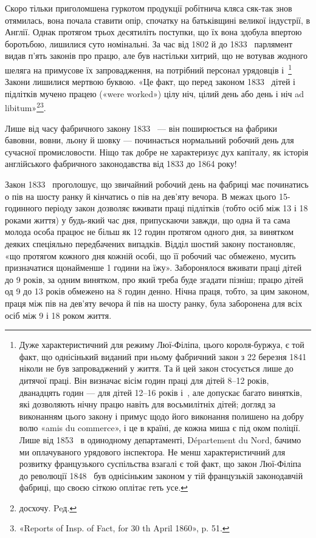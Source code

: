 Скоро тільки приголомшена гуркотом продукції робітнича
кляса сяк-так знов отямилась, вона почала ставити опір, спочатку
на батьківщині великої індустрії, в Англії. Однак протягом
трьох десятиліть поступки, що їх вона здобула впертою боротьбою,
лишилися суто номінальні. За час від 1802 й до 1833~
парлямент видав п’ять законів про працю, але був настільки
хитрий, що не вотував жодного шеляга на примусове їх запровадження,
на потрібний персонал урядовців і~\footnote{
Дуже характеристичний для режиму Люї-Філіпа, цього короля-буржуа,
є той факт, що однісінький виданий при ньому фабричний
закон з 22 березня 1841~ ніколи не був запроваджений у життя. Та й цей
закон стосується лише до дитячої праці. Він визначає вісім годин праці для
дітей 8--12 років, дванадцять годин — для дітей 12--16 років і~, але допускає багато винятків, які дозволяють нічну працю навіть
для восьмилітніх дітей; догляд за виконанням цього закону і примус
щодо його виконання полишено на добру волю «amis du commerce», і це
в країні, де кожна миша є під оком поліції. Лише від 1853~ в одинодному
департаменті, Département du Nord, бачимо ми оплачуваного урядового
інспектора. Не менш характеристичний для розвитку французького
суспільства взагалі є той факт, що закон Люї-Філіпа до революції 1848~
був однісіньким законом у тій французькій законодавчій фабриці, що
своєю сіткою оплітає геть усе.
} Закони лишилися
мертвою буквою. «Це факт, що перед законом 1833~ дітей
і підлітків мучено працею («were worked») цілу ніч, цілий день
або день і ніч ad libitum»\footnote*{
досхочу. Peд.
}\footnote{
«Reports of Insp. of Fact, for 30 th April 1860», p. 51.
}.

Лише від часу фабричного закону 1833~ — він поширюється
на фабрики бавовни, вовни, льону й шовку — починається нормальний
робочий день для сучасної промисловости. Ніщо так
добре не характеризує дух капіталу, як історія англійського
фабричного законодавства від 1833 до 1864 року!

Закон 1833~ проголошує, що звичайний робочий день на
фабриці має починатись о пів на шосту ранку й кінчатись о пів
на дев’яту вечора. В межах цього 15-годинного періоду закон
дозволяє вживати праці підлітків (тобто осіб між 13 і 18 роками
життя) у будь-який час дня, припускаючи завжди, що одна й
та сама молода особа працює не більш як 12 годин протягом одного
дня, за винятком деяких спеціяльно передбачених випадків. Відділ
шостий закону постановляє, «що протягом кожного дня кожній
особі, що її робочий час обмежено, мусить призначатися щонайменше
1 години на їжу». Заборонялося вживати праці дітей
до 9 років, за одним винятком, про який треба буде згадати пізніш;
працю дітей од 9 до 13 років обмежено на 8 годин денно.
Нічна праця, тобто, за цим законом, праця між пів на дев’яту
вечора й пів на шосту ранку, була заборонена для всіх осіб між
9 і 18 роком життя.

